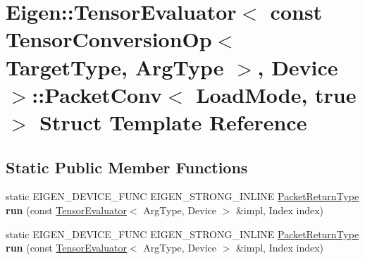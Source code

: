 \hypertarget{struct_eigen_1_1_tensor_evaluator_3_01const_01_tensor_conversion_op_3_01_target_type_00_01_arg_t2fb5a078ff43de9fbe10110949df4d26}{}\section{Eigen\+:\+:Tensor\+Evaluator$<$ const Tensor\+Conversion\+Op$<$ Target\+Type, Arg\+Type $>$, Device $>$\+:\+:Packet\+Conv$<$ Load\+Mode, true $>$ Struct Template Reference}
\label{struct_eigen_1_1_tensor_evaluator_3_01const_01_tensor_conversion_op_3_01_target_type_00_01_arg_t2fb5a078ff43de9fbe10110949df4d26}
\subsection*{Static Public Member Functions}
\begin{DoxyCompactItemize}
\item 
\mbox{\label{struct_eigen_1_1_tensor_evaluator_3_01const_01_tensor_conversion_op_3_01_target_type_00_01_arg_t2fb5a078ff43de9fbe10110949df4d26_aec734545f9037af6c0da9bfba7c06cff}} 
static E\+I\+G\+E\+N\+\_\+\+D\+E\+V\+I\+C\+E\+\_\+\+F\+U\+NC E\+I\+G\+E\+N\+\_\+\+S\+T\+R\+O\+N\+G\+\_\+\+I\+N\+L\+I\+NE \hyperlink{group___sparse_core___module}{Packet\+Return\+Type} {\bfseries run} (const \hyperlink{struct_eigen_1_1_tensor_evaluator}{Tensor\+Evaluator}$<$ Arg\+Type, Device $>$ \&impl, Index index)
\item 
\mbox{\label{struct_eigen_1_1_tensor_evaluator_3_01const_01_tensor_conversion_op_3_01_target_type_00_01_arg_t2fb5a078ff43de9fbe10110949df4d26_aec734545f9037af6c0da9bfba7c06cff}} 
static E\+I\+G\+E\+N\+\_\+\+D\+E\+V\+I\+C\+E\+\_\+\+F\+U\+NC E\+I\+G\+E\+N\+\_\+\+S\+T\+R\+O\+N\+G\+\_\+\+I\+N\+L\+I\+NE \hyperlink{group___sparse_core___module}{Packet\+Return\+Type} {\bfseries run} (const \hyperlink{struct_eigen_1_1_tensor_evaluator}{Tensor\+Evaluator}$<$ Arg\+Type, Device $>$ \&impl, Index index)
\end{DoxyCompactItemize}


